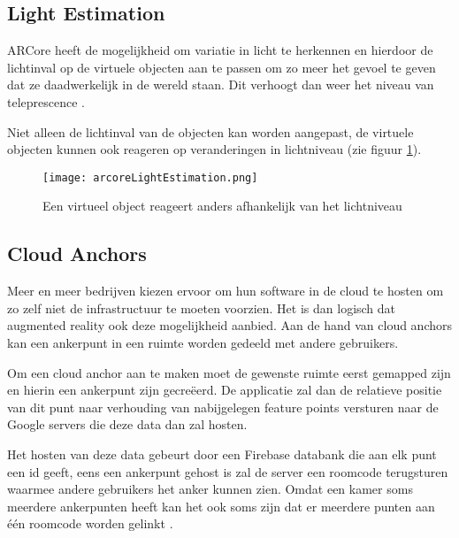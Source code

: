 \subsection{Light Estimation}
ARCore heeft de mogelijkheid om variatie in licht te herkennen en hierdoor de lichtinval op de virtuele objecten aan te passen om zo meer het gevoel te geven dat ze daadwerkelijk in de wereld staan. Dit verhoogt dan weer het niveau van teleprescence \autocite{ARCoreConcepts}.

Niet alleen de lichtinval van de objecten kan worden aangepast, de virtuele objecten kunnen ook reageren op veranderingen in lichtniveau (zie figuur \ref{fig:arcoreLightEstimation}).

\begin{figure}
    \texttt{[image: arcoreLightEstimation.png]}
    \caption{Een virtueel object reageert anders afhankelijk van het lichtniveau}
    \label{fig:arcoreLightEstimation}
\end{figure}

\subsection{Cloud Anchors}
Meer en meer bedrijven kiezen ervoor om hun software in de cloud te hosten om zo zelf niet de infrastructuur te moeten voorzien. Het is dan logisch dat augmented reality ook deze mogelijkheid aanbied. Aan de hand van cloud anchors kan een ankerpunt in een ruimte worden gedeeld met andere gebruikers. 

Om een cloud anchor aan te maken moet de gewenste ruimte eerst gemapped zijn en hierin een ankerpunt zijn gecreëerd. De applicatie zal dan de relatieve positie van dit punt naar verhouding van nabijgelegen feature points versturen naar de Google servers die deze data dan zal hosten. 

Het hosten van deze data gebeurt door een Firebase databank die aan elk punt een id geeft, eens een ankerpunt gehost is zal de server een roomcode terugsturen waarmee andere gebruikers het anker kunnen zien. Omdat een kamer soms meerdere ankerpunten heeft kan het ook soms zijn dat er meerdere punten aan één roomcode worden gelinkt \autocite{ARCoreCloudAnchors}.


